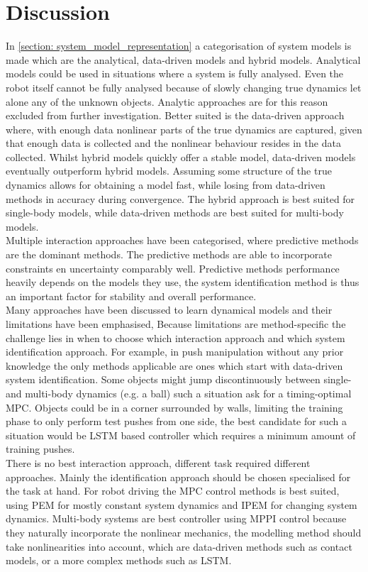 \section{Discussion}
\label{section: controllers_discussion}
In \cref{section: system_model_representation} a categorisation of system models is made which are the analytical, data-driven models and hybrid models. Analytical models could be used in situations where a system is fully analysed. Even the robot itself cannot be fully analysed because of slowly changing true dynamics let alone any of the unknown objects. Analytic approaches are for this reason excluded from further investigation. Better suited is the data-driven approach where, with enough data nonlinear parts of the true dynamics are captured, given that enough data is collected and the nonlinear behaviour resides in the data collected. Whilst hybrid models quickly offer a stable model, data-driven models eventually outperform hybrid models. Assuming some structure of the true dynamics allows for obtaining a model fast, while losing from data-driven methods in accuracy during convergence. The hybrid approach is best suited for single-body models, while data-driven methods are best suited for multi-body models. \\

Multiple interaction approaches have been categorised, where predictive methods are the dominant methods. The predictive methods are able to incorporate constraints en uncertainty comparably well. Predictive methods performance heavily depends on the models they use, the system identification method is thus an important factor for stability and overall performance. \\

Many approaches have been discussed to learn dynamical models and their limitations have been emphasised, Because limitations are method-specific the challenge lies in when to choose which interaction approach and which system identification approach. For example, in push manipulation without any prior knowledge the only methods applicable are ones which start with data-driven system identification. Some objects might jump discontinuously between single- and multi-body dynamics (e.g. a ball) such a situation ask for a timing-optimal \ac{MPC}. Objects could be in a corner surrounded by walls, limiting the training phase to only perform test pushes from one side, the best candidate for such a situation would be \ac{LSTM} based controller which requires a minimum amount of training pushes. \\

There is no best interaction approach, different task required different approaches. Mainly the identification approach should be chosen specialised for the task at hand. For robot driving the \ac{MPC} control methods is best suited, using \ac{PEM} for mostly constant system dynamics and \ac{IPEM} for changing system dynamics. Multi-body systems are best controller using \ac{MPPI} control because they naturally incorporate the nonlinear mechanics, the modelling method should take nonlinearities into account, which are data-driven methods such as contact models, or a more complex methods such as \ac{LSTM}. 

